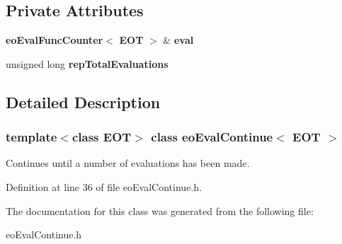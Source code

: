 \subsection*{Private Attributes}
\begin{CompactItemize}
\item 
{\bf eo\-Eval\-Func\-Counter}$<$ {\bf EOT} $>$ \& {\bf eval}\label{classeo_eval_continue_r0}

\item 
unsigned long {\bf rep\-Total\-Evaluations}\label{classeo_eval_continue_r1}

\end{CompactItemize}


\subsection{Detailed Description}
\subsubsection*{template$<$class EOT$>$ class eo\-Eval\-Continue$<$ EOT $>$}

Continues until a number of evaluations has been made. 



Definition at line 36 of file eo\-Eval\-Continue.h.

The documentation for this class was generated from the following file:\begin{CompactItemize}
\item 
eo\-Eval\-Continue.h\end{CompactItemize}
